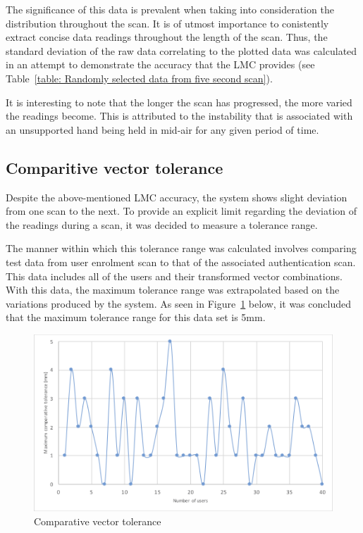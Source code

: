 The significance of this data is prevalent when taking into consideration the distribution throughout the scan. It is of utmost importance to conistently extract concise data readings throughout the length of the scan. Thus, the standard deviation of the raw data correlating to the plotted data was calculated in an attempt to demonstrate the accuracy that the LMC provides (see Table~\ref{table: Randomly selected data from five second scan}).

It is interesting to note that the longer the scan has progressed, the more varied the readings become. This is attributed to the instability that is associated with an unsupported hand being held in mid-air for any given period of time.

\subsection{Comparitive vector tolerance}

Despite the above-mentioned LMC accuracy, the system shows slight deviation from one scan to the next. To provide an explicit limit regarding the deviation of the readings during a scan, it was decided to measure a tolerance range.

The manner within which this tolerance range was calculated involves comparing test data from user enrolment scan to that of the associated authentication scan. This data includes all of the users and their transformed vector combinations. With this data, the maximum tolerance range was extrapolated based on the variations produced by the system. As seen in Figure~\ref{fig:Comparative vector tolerance} below, it was concluded that the maximum tolerance range for this data set is 5mm.

    
    \begin{figure}[htbp!] 
    \centering    
    \includegraphics[width=1.0\textwidth]{Chapter4/Figs/Comparative.png}
    \caption[Comparative vector tolerance]{Comparative vector tolerance}
    \label{fig:Comparative vector tolerance}
    \end{figure}

